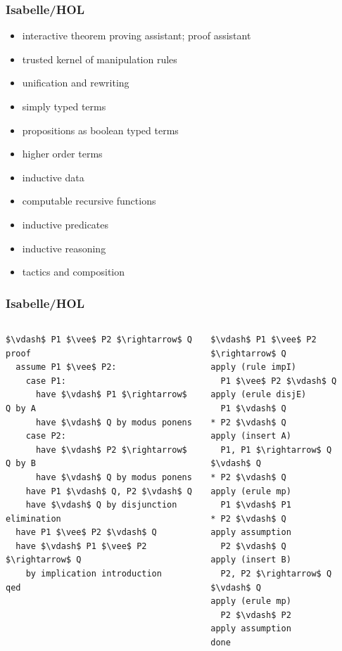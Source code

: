 \documentclass{beamer}
\begin{document}
\begin{frame}
\frametitle{Isabelle/HOL}
\begin{itemize}
\item interactive theorem proving assistant; proof assistant
\item trusted kernel of manipulation rules
\item unification and rewriting
\item simply typed terms
\item propositions as boolean typed terms
\item higher order terms
\item inductive data
\item computable recursive functions
\item inductive predicates
\item inductive reasoning
\item tactics and composition
\end{itemize}
\end{frame}



\begin{frame}[fragile]
	\frametitle{Isabelle/HOL}
\begin{columns}
\begin{column}{0.5\textwidth}
\begin{lstlisting}[language=logic, mathescape]
$\vdash$ P1 $\vee$ P2 $\rightarrow$ Q
proof
  assume P1 $\vee$ P2:
    case P1:
      have $\vdash$ P1 $\rightarrow$ Q by A
      have $\vdash$ Q by modus ponens
    case P2:
      have $\vdash$ P2 $\rightarrow$ Q by B    
      have $\vdash$ Q by modus ponens
    have P1 $\vdash$ Q, P2 $\vdash$ Q
    have $\vdash$ Q by disjunction elimination
  have P1 $\vee$ P2 $\vdash$ Q
  have $\vdash$ P1 $\vee$ P2 $\rightarrow$ Q
    by implication introduction  
qed
\end{lstlisting}
\end{column}

\begin{column}{0.5\textwidth}
\begin{lstlisting}[language=logic, mathescape]
$\vdash$ P1 $\vee$ P2 $\rightarrow$ Q
apply (rule impI)
  P1 $\vee$ P2 $\vdash$ Q
apply (erule disjE)
  P1 $\vdash$ Q
* P2 $\vdash$ Q
apply (insert A)
  P1, P1 $\rightarrow$ Q $\vdash$ Q
* P2 $\vdash$ Q
apply (erule mp)
  P1 $\vdash$ P1
* P2 $\vdash$ Q
apply assumption 
  P2 $\vdash$ Q
apply (insert B)
  P2, P2 $\rightarrow$ Q $\vdash$ Q
apply (erule mp)
  P2 $\vdash$ P2
apply assumption 
done
\end{lstlisting}
\end{column}
\end{columns}
\end{frame}
\end{document}
